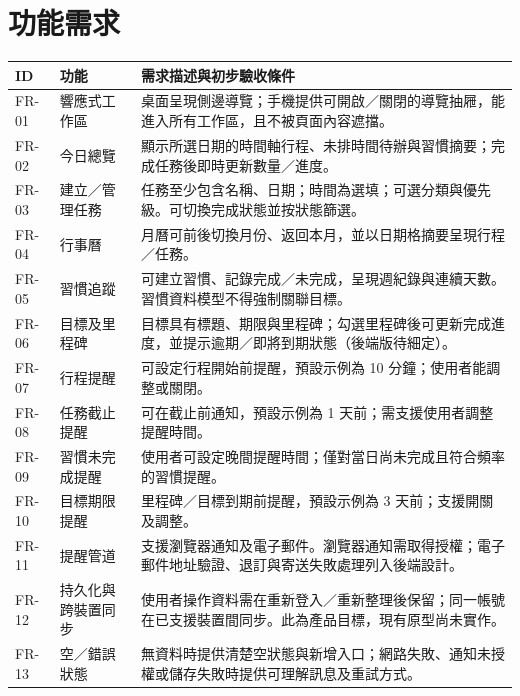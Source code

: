 \documentclass[12pt]{article}
\begin{document}
\section{功能需求}
\begin{longtable}{p{1.2cm}p{4cm}p{7.8cm}}\toprule
ID & 功能 & 需求描述與初步驗收條件\\\midrule
FR-01 & 響應式工作區 & 桌面呈現側邊導覽；手機提供可開啟／關閉的導覽抽屜，能進入所有工作區，且不被頁面內容遮擋。\\
FR-02 & 今日總覽 & 顯示所選日期的時間軸行程、未排時間待辦與習慣摘要；完成任務後即時更新數量／進度。\\
FR-03 & 建立／管理任務 & 任務至少包含名稱、日期；時間為選填；可選分類與優先級。可切換完成狀態並按狀態篩選。\\
FR-04 & 行事曆 & 月曆可前後切換月份、返回本月，並以日期格摘要呈現行程／任務。\\
FR-05 & 習慣追蹤 & 可建立習慣、記錄完成／未完成，呈現週紀錄與連續天數。習慣資料模型不得強制關聯目標。\\
FR-06 & 目標及里程碑 & 目標具有標題、期限與里程碑；勾選里程碑後可更新完成進度，並提示逾期／即將到期狀態（後端版待細定）。\\
FR-07 & 行程提醒 & 可設定行程開始前提醒，預設示例為 10 分鐘；使用者能調整或關閉。\\
FR-08 & 任務截止提醒 & 可在截止前通知，預設示例為 1 天前；需支援使用者調整提醒時間。\\
FR-09 & 習慣未完成提醒 & 使用者可設定晚間提醒時間；僅對當日尚未完成且符合頻率的習慣提醒。\\
FR-10 & 目標期限提醒 & 里程碑／目標到期前提醒，預設示例為 3 天前；支援開關及調整。\\
FR-11 & 提醒管道 & 支援瀏覽器通知及電子郵件。瀏覽器通知需取得授權；電子郵件地址驗證、退訂與寄送失敗處理列入後端設計。\\
FR-12 & 持久化與跨裝置同步 & 使用者操作資料需在重新登入／重新整理後保留；同一帳號在已支援裝置間同步。此為產品目標，現有原型尚未實作。\\
FR-13 & 空／錯誤狀態 & 無資料時提供清楚空狀態與新增入口；網路失敗、通知未授權或儲存失敗時提供可理解訊息及重試方式。\\\bottomrule\end{longtable}
\end{document}
